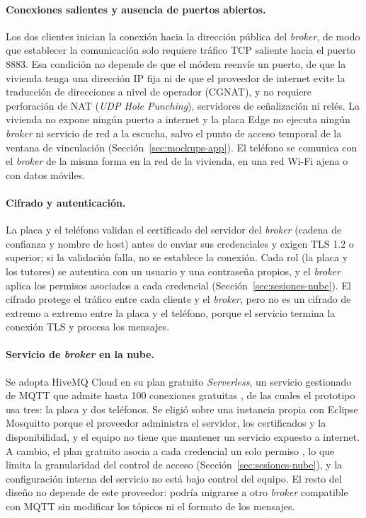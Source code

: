 \documentclass[12pt,a4paper,oneside]{book}
\theoremstyle{plain}
\theoremstyle{definition}
\theoremstyle{remark}
\begin{document}
\paragraph{Conexiones salientes y ausencia de puertos abiertos.} Los dos clientes inician la conexión hacia la dirección pública del \textit{broker}, de modo que establecer la comunicación solo requiere tráfico TCP saliente hacia el puerto 8883. Esa condición no depende de que el módem reenvíe un puerto, de que la vivienda tenga una dirección IP fija ni de que el proveedor de internet evite la traducción de direcciones a nivel de operador (CGNAT), y no requiere perforación de NAT (\textit{UDP Hole Punching}), servidores de señalización ni relés. La vivienda no expone ningún puerto a internet y la placa Edge no ejecuta ningún \textit{broker} ni servicio de red a la escucha, salvo el punto de acceso temporal de la ventana de vinculación (Sección~\ref{sec:mockups-app}). El teléfono se comunica con el \textit{broker} de la misma forma en la red de la vivienda, en una red Wi-Fi ajena o con datos móviles.

\paragraph{Cifrado y autenticación.} La placa y el teléfono validan el certificado del servidor del \textit{broker} (cadena de confianza y nombre de host) antes de enviar sus credenciales y exigen TLS 1.2 o superior; si la validación falla, no se establece la conexión. Cada rol (la placa y los tutores) se autentica con un usuario y una contraseña propios, y el \textit{broker} aplica los permisos asociados a cada credencial (Sección~\ref{sec:sesiones-nube}). El cifrado protege el tráfico entre cada cliente y el \textit{broker}, pero no es un cifrado de extremo a extremo entre la placa y el teléfono, porque el servicio termina la conexión TLS y procesa los mensajes.

\paragraph{Servicio de \textit{broker} en la nube.} Se adopta HiveMQ Cloud en su plan gratuito \textit{Serverless}, un servicio gestionado de MQTT que admite hasta 100 conexiones gratuitas \parencite{hivemq2026planes}, de las cuales el prototipo usa tres: la placa y dos teléfonos. Se eligió sobre una instancia propia con Eclipse Mosquitto \parencite{mosquitto_2018} porque el proveedor administra el servidor, los certificados y la disponibilidad, y el equipo no tiene que mantener un servicio expuesto a internet. A cambio, el plan gratuito asocia a cada credencial un solo permiso \parencite{hivemq2026acceso}, lo que limita la granularidad del control de acceso (Sección~\ref{sec:sesiones-nube}), y la configuración interna del servicio no está bajo control del equipo. El resto del diseño no depende de este proveedor: podría migrarse a otro \textit{broker} compatible con MQTT sin modificar los tópicos ni el formato de los mensajes.
\end{document}
